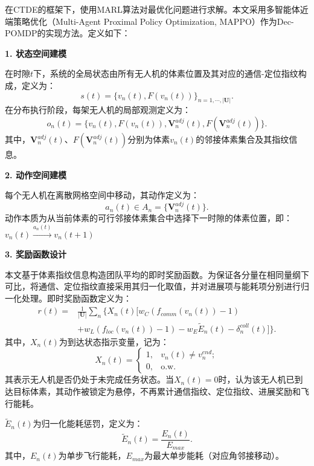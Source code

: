 \documentclass[lettersize,journal]{IEEEtran}
\begin{document}
在CTDE的框架下，使用MARL算法对最优化问题进行求解。本文采用多智能体近端策略优化（Multi-Agent Proximal Policy Optimization, MAPPO）作为Dec-POMDP的实现方法。定义如下：

\noindent\textbf{1. 状态空间建模}

在时隙$t$下，系统的全局状态由所有无人机的体素位置及其对应的通信-定位指纹构成，定义为：
\begin{equation}
s(t)=\{v_n(t),F(v_n(t))\}_{n=1,\cdots,|\mathbf{U}|}.
\end{equation}
在分布执行阶段，每架无人机的局部观测定义为：
\begin{equation}
o_n(t)=\{v_n(t),F(v_n(t)),\mathbf{V}_n^{adj}(t),F(\mathbf{V}_n^{adj}(t))\}.
\end{equation}
其中，$\mathbf{V}_n^{adj}(t)$、$F(\mathbf{V}_n^{adj}(t))$分别为体素$v_n(t)$的邻接体素集合及其指纹信息。

\noindent\textbf{2. 动作空间建模}

每个无人机在离散网格空间中移动，其动作定义为：
\begin{equation}
a_n(t)\in A_n=\{\mathbf{V}_n^{adj}(t)\}.
\end{equation}
动作本质为从当前体素的可行邻接体素集合中选择下一时隙的体素位置，即：$v_n(t)\xrightarrow{a_n(t)}v_n(t+1)$

\noindent\textbf{3. 奖励函数设计}

本文基于体素指纹信息构造团队平均的即时奖励函数。为保证各分量在相同量纲下可比，将通信、定位指纹直接采用其归一化取值，并对进展项与能耗项分别进行归一化处理。即时奖励函数定义为：
\begin{equation}
\begin{aligned}
r(t)=& \frac{1}{|\mathbf{U}|}\sum_{n}\Big\{X_n(t)\Big[
 w_C(f_{comm}(v_n(t))-1)\\
&+w_L(f_{loc}(v_n(t))-1)-w_E\widetilde{E}_n(t)-\delta_n^{coll}(t)\Big]\Big\}.
\end{aligned}
\end{equation}
其中，$X_n(t)$为到达状态指示变量，记为：
\begin{equation}
X_n(t)=
\begin{cases}
1, & v_n(t)\ne v_n^{end};\\
0, & \text{o.w.}
\end{cases}
\end{equation}
其表示无人机是否仍处于未完成任务状态。当$X_n(t)=0$时，认为该无人机已到达目标体素，其动作被锁定为悬停，不再累计通信指纹、定位指纹、进展奖励和飞行能耗。

$\widetilde{E}_n(t)$为归一化能耗惩罚，定义为：
\begin{equation}
\widetilde{E}_n(t)=\frac{E_n(t)}{E_{max}}.
\end{equation}
其中，$E_n(t)$为单步飞行能耗，$E_{max}$为最大单步能耗（对应角邻接移动）。
\end{document}

